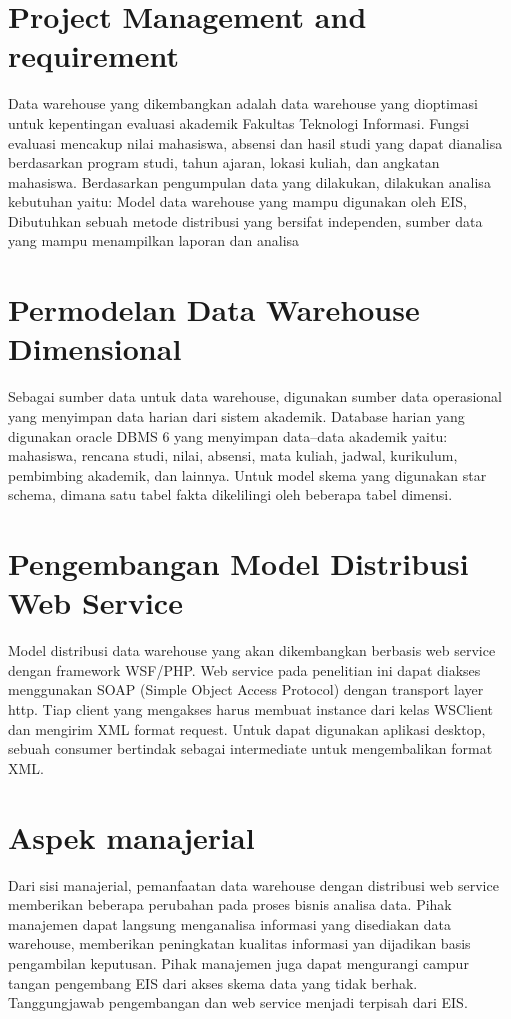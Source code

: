 \documentclass[12pt,a4paper]{article}
\begin{document}
\section{Project Management and requirement}
Data warehouse yang dikembangkan adalah data warehouse yang dioptimasi untuk kepentingan evaluasi akademik Fakultas Teknologi Informasi. Fungsi evaluasi mencakup nilai mahasiswa, absensi dan hasil studi yang dapat dianalisa berdasarkan program studi, tahun ajaran, lokasi kuliah, dan angkatan mahasiswa. Berdasarkan pengumpulan data yang dilakukan, dilakukan analisa kebutuhan yaitu: Model data warehouse yang mampu digunakan oleh EIS, Dibutuhkan sebuah metode distribusi yang bersifat independen, sumber data yang mampu menampilkan laporan dan analisa


\section{Permodelan Data Warehouse Dimensional}
Sebagai sumber data untuk data warehouse, digunakan sumber data operasional yang menyimpan data harian dari sistem akademik. Database harian yang digunakan  oracle DBMS 6 yang menyimpan data–data akademik yaitu: mahasiswa, rencana studi, nilai, absensi, mata kuliah, jadwal, kurikulum, pembimbing akademik, dan lainnya. Untuk model skema yang digunakan star schema, dimana satu tabel fakta dikelilingi oleh beberapa tabel dimensi. 


\section{Pengembangan Model Distribusi Web Service}
Model distribusi data warehouse yang akan dikembangkan berbasis web service dengan framework WSF/PHP.    
Web service pada penelitian ini dapat diakses menggunakan SOAP (Simple Object Access Protocol) dengan transport layer http. 
Tiap client yang mengakses harus membuat instance dari kelas WSClient dan mengirim XML format request. 
Untuk dapat digunakan aplikasi desktop, sebuah consumer bertindak sebagai intermediate untuk mengembalikan format XML.


\section{Aspek manajerial}
Dari sisi manajerial, pemanfaatan data warehouse dengan distribusi web service
memberikan beberapa perubahan pada proses bisnis analisa data. Pihak manajemen
dapat langsung menganalisa informasi yang disediakan data warehouse, memberikan
peningkatan kualitas informasi yan dijadikan basis pengambilan keputusan. Pihak manajemen juga dapat mengurangi
campur tangan pengembang EIS dari akses skema data yang tidak berhak. Tanggungjawab pengembangan dan web service
menjadi terpisah dari EIS. 
\end{document}
